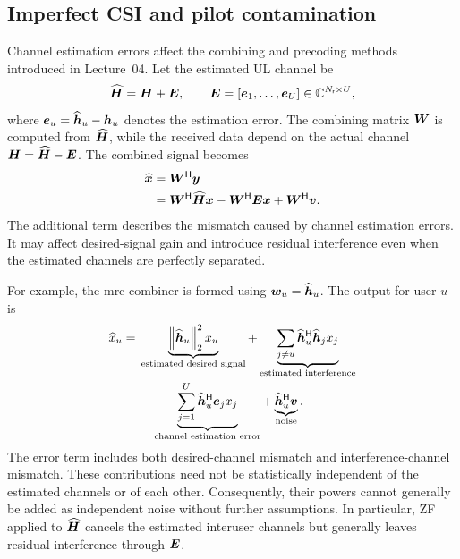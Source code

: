 \subsection{Imperfect CSI and pilot contamination}
Channel estimation errors affect the combining and precoding methods introduced in Lecture~04. Let the estimated UL channel be
\begin{equation}
	\widehat{\bm{H}}=\bm{H}+\bm{E},
	\qquad
	\bm{E}=[\bm{e}_1,\ldots,\bm{e}_U]\in\mathbb{C}^{N_{\mathsf{r}}\times U},
	\label{eq:channelerror-05}
\end{equation}
where $\bm{e}_u=\widehat{\bm{h}}_u-\bm{h}_u$ denotes the estimation error. The combining matrix $\bm{W}$ is computed from $\widehat{\bm{H}}$, while the received data depend on the actual channel $\bm{H}=\widehat{\bm{H}}-\bm{E}$. The combined signal becomes
\begin{equation}
	\begin{split}
		\widehat{\bm{x}}
		&={\bm{W}}^{\mathsf{H}}\bm{y}\\
		&={\bm{W}}^{\mathsf{H}}\widehat{\bm{H}}\bm{x}
		-{\bm{W}}^{\mathsf{H}}\bm{E}\bm{x}
		+{\bm{W}}^{\mathsf{H}}\bm{v}.
	\end{split}
	\label{eq:imperfectcombining-05}
\end{equation}
The additional term describes the mismatch caused by channel estimation errors. It may affect desired-signal gain and introduce residual interference even when the estimated channels are perfectly separated.

For example, the \ac{mrc} combiner is formed using $\bm{w}_u=\widehat{\bm{h}}_u$. The output for user $u$ is
\begin{equation}
	\begin{split}
		\widehat x_u
		={}&\underbrace{\left\|\widehat{\bm{h}}_u\right\|_2^2x_u}_{\text{estimated desired signal}}
		+\underbrace{\sum_{j\ne u}
			{\widehat{\bm{h}}}^{\mathsf{H}}_u\widehat{\bm{h}}_j x_j}_{\text{estimated interference}}\\
		&-\underbrace{\sum_{j=1}^{U}
			{\widehat{\bm{h}}}^{\mathsf{H}}_u\bm{e}_jx_j}_{\text{channel estimation error}}
		+\underbrace{{\widehat{\bm{h}}}^{\mathsf{H}}_u\bm{v}}_{\text{noise}}.
	\end{split}
	\label{eq:imperfectmrc-05}
\end{equation}
The error term includes both desired-channel mismatch and interference-channel mismatch. These contributions need not be statistically independent of the estimated channels or of each other. Consequently, their powers cannot generally be added as independent noise without further assumptions. In particular, ZF applied to $\widehat{\bm{H}}$ cancels the estimated interuser channels but generally leaves residual interference through $\bm{E}$.

